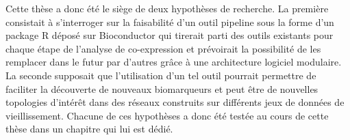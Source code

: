 Cette thèse a donc été le siège de deux hypothèses de recherche. La première consistait à s'interroger sur la faisabilité d'un outil pipeline sous la forme d'un package R déposé sur Bioconductor qui tirerait parti des outils existants pour chaque étape de l'analyse de co-expression et prévoirait la possibilité de les remplacer dans le futur par d'autres grâce à une architecture logiciel modulaire. La seconde supposait que l'utilisation d'un tel outil pourrait permettre de faciliter la découverte de nouveaux biomarqueurs et peut être de nouvelles topologies d'intérêt dans des réseaux construits sur différents jeux de données de vieillissement. Chacune de ces hypothèses a donc été testée au cours de cette thèse dans un chapitre qui lui est dédié.




% 
% 

